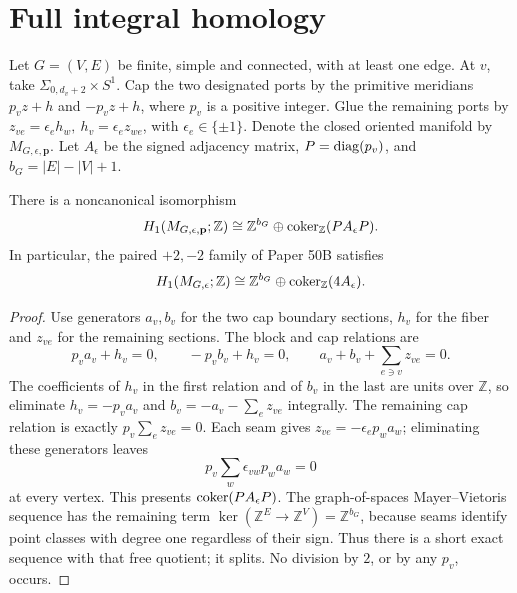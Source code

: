 \section{Full integral homology}
Let \(G=(V,E)\) be finite, simple and connected, with at least one edge.
At \(v\), take \(\Sigma_{0,d_v+2}\times S^1\). Cap the two designated
ports by the primitive meridians \(p_vz+h\) and \(-p_vz+h\), where
\(p_v\) is a positive integer. Glue the remaining ports by
\(z_{ve}=\epsilon_eh_w,\ h_v=\epsilon_ez_{we}\), with
\(\epsilon_e\in\{\pm1\}\). Denote the closed oriented manifold by
\(M_{G,\epsilon,\mathbf p}\). Let \(A_\epsilon\) be the signed
adjacency matrix, \(P=\operatorname{diag}(p_v)\), and \(b_G=|E|-|V|+1\).

\begin{theorem}
There is a noncanonical isomorphism
\[
 H_1(M_{G,\epsilon,\mathbf p};\mathbb Z)
 \cong \mathbb Z^{b_G}\oplus\operatorname{coker}_{\mathbb Z}(P A_\epsilon P).
\]
In particular, the paired \(+2,-2\) family of Paper 50B satisfies
\[
 H_1(M_{G,\epsilon};\mathbb Z)
 \cong \mathbb Z^{b_G}\oplus\operatorname{coker}_{\mathbb Z}(4A_\epsilon).
\]
\end{theorem}
\begin{proof}
Use generators \(a_v,b_v\) for the two cap boundary sections, \(h_v\)
for the fiber and \(z_{ve}\) for the remaining sections. The block and
cap relations are
\[
 p_va_v+h_v=0,\qquad -p_vb_v+h_v=0,\qquad
 a_v+b_v+\sum_{e\ni v}z_{ve}=0.
\]
The coefficients of \(h_v\) in the first relation and of \(b_v\) in
the last are units over \(\mathbb Z\), so eliminate
\(h_v=-p_va_v\) and \(b_v=-a_v-\sum_ez_{ve}\) integrally.
The remaining cap relation is exactly
\(p_v\sum_ez_{ve}=0\). Each seam gives
\(z_{ve}=-\epsilon_ep_wa_w\); eliminating these generators leaves
\[
 p_v\sum_w\epsilon_{vw}p_wa_w=0
\]
at every vertex. This presents \(\operatorname{coker}(PA_\epsilon P)\).
The graph-of-spaces Mayer--Vietoris sequence has the remaining term
\(\ker(\mathbb Z^E\to\mathbb Z^V)=\mathbb Z^{b_G}\), because
seams identify point classes with degree one regardless of their sign.
Thus there is a short exact sequence with that free quotient; it splits.
No division by \(2\), or by any \(p_v\), occurs.
\end{proof}

